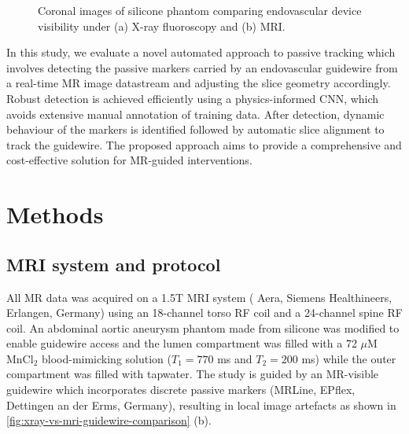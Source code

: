 \documentclass[conference]{IEEEtran}
\begin{document}
\begin{figure}[h]
\begin{minipage}{0.241\textwidth}
    \end{minipage}\hfill \hspace*{0cm}
    \caption{Coronal images of silicone phantom comparing endovascular device visibility under (a) X-ray fluoroscopy and (b) MRI.}
    \label{fig:xray-vs-mri-guidewire-comparison}
\end{figure}

In this study, we evaluate a novel automated approach to passive tracking which involves detecting the passive markers carried by an endovascular guidewire from a real-time MR image datastream and adjusting the slice geometry accordingly. Robust detection is achieved efficiently using a physics-informed CNN, which avoids extensive manual annotation of training data. After detection, dynamic behaviour of the markers is identified followed by automatic slice alignment to track the guidewire. The proposed approach aims to provide a comprehensive and cost-effective solution for MR-guided interventions.

\section{Methods}

\subsection{MRI system and protocol}\label{MRI-settings}

All MR data was acquired on a 1.5T MRI system ( Aera, Siemens Healthineers, Erlangen, Germany) using an 18-channel torso RF coil and a 24-channel spine RF coil. An abdominal aortic aneurysm phantom made from silicone was modified to enable guidewire access \cite{pmid28689483} and the lumen compartment was filled with a 72 $\mu$M MnCl$_2$ blood-mimicking solution ($T_1 = 770$ ms and $T_2 = 200$ ms) while the outer compartment was filled with tapwater. The study is guided by an MR-visible guidewire which incorporates discrete passive markers (MRLine, EPflex, Dettingen an der Erms, Germany), resulting in local image artefacts as shown in \autoref{fig:xray-vs-mri-guidewire-comparison} (b).
\end{document}

